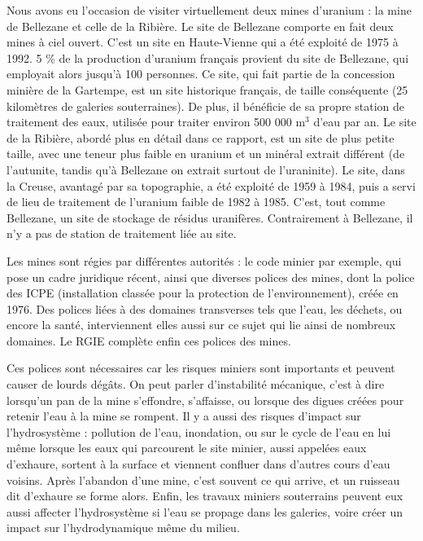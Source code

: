 \documentclass{article}
\begin{document}
Nous avons eu l’occasion de visiter virtuellement deux mines d’uranium : la mine de Bellezane et celle de la Ribière. Le site de Bellezane comporte en fait deux mines à ciel ouvert. C’est un site en Haute-Vienne qui a été exploité de 1975 à 1992. 5 \% de la production d’uranium français provient du site de Bellezane, qui employait alors jusqu’à 100 personnes. Ce site, qui fait partie de la concession minière de la Gartempe, est un site historique français, de taille conséquente (25 kilomètres de galeries souterraines). De plus, il bénéficie de sa propre station de traitement des eaux, utilisée pour traiter environ 500 000 $\text{m}^3$ d’eau par an.
Le site de la Ribière, abordé plus en détail dans ce rapport, est un site de plus petite taille, avec une teneur plus faible en uranium et un minéral extrait différent (de l’autunite, tandis qu’à Bellezane on extrait surtout de l’uraninite). Le site, dans la Creuse, avantagé par sa topographie, a été exploité de 1959 à 1984, puis a servi de lieu de traitement de l’uranium faible de 1982 à 1985. C’est, tout comme Bellezane, un site de stockage de résidus uranifères. Contrairement à Bellezane, il n’y a pas de station de traitement liée au site.


Les mines sont régies par différentes autorités : le code minier par exemple, qui pose un cadre juridique récent, ainsi que diverses polices des mines, dont la police des ICPE (installation classée pour la protection de l’environnement), créée en 1976. 
Des polices liées à des domaines transverses tels que l’eau, les déchets, ou encore la santé, interviennent elles aussi sur ce sujet qui lie ainsi de nombreux domaines. Le RGIE complète enfin ces polices des mines.


Ces polices sont nécessaires car les risques miniers sont importants et peuvent causer de lourds dégâts. On peut parler d’instabilité mécanique, c’est à dire lorsqu’un pan de la mine s’effondre, s’affaisse, ou lorsque des digues créées pour retenir l’eau à la mine se rompent. Il y a aussi des risques d’impact sur l’hydrosystème : pollution de l’eau, inondation, ou sur le cycle de l’eau en lui même lorsque les eaux qui parcourent le site minier, aussi appelées eaux d’exhaure, sortent à la surface et viennent confluer dans d’autres cours d’eau voisins.
Après l’abandon d’une mine, c’est souvent ce qui arrive, et un ruisseau dit d’exhaure se forme alors. Enfin, les travaux miniers souterrains peuvent eux aussi affecter l’hydrosystème si l’eau se propage dans les galeries, voire créer un impact sur l’hydrodynamique même du milieu.
\end{document}

